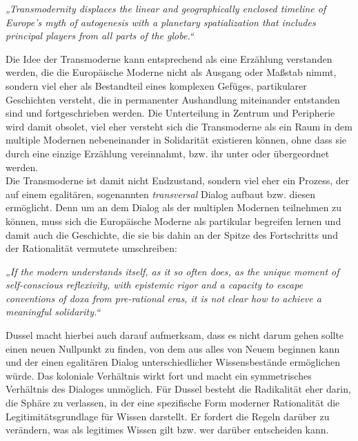 \begin{myenv}
    \textit{„Transmodernity displaces the linear and geographically enclosed timeline of
    Europe’s myth of autogenesis with a planetary spatialization that includes
    principal players from all parts of the globe.“\footnotemark}
\end{myenv}

Die Idee der Transmoderne kann entsprechend als eine Erzählung verstanden
werden, die die Europäische Moderne nicht als Ausgang oder Maßstab nimmt,
sondern viel eher als Bestandteil eines komplexen Gefüges, partikularer
Geschichten versteht, die in permanenter Aushandlung miteinander entstanden sind
und fortgeschrieben werden. Die Unterteilung in Zentrum und Peripherie wird
damit obsolet, viel eher versteht sich die Transmoderne als ein Raum in dem
multiple Modernen nebeneinander in Solidarität existieren können, ohne dass sie
durch eine einzige Erzählung vereinnahmt, bzw. ihr unter oder übergeordnet
werden.\footnotemark {}
\\

Die Transmoderne ist damit nicht Endzustand, sondern viel eher ein Prozess, der
auf einem egalitären, sogenannten \textit{transversal} Dialog aufbaut bzw. diesen
ermöglicht. Denn um an dem Dialog als der multiplen Modernen teilnehmen zu
können, muss sich die Europäische Moderne als partikular begreifen lernen und
damit auch die Geschichte, die sie bis dahin an der Spitze des Fortschritts und
der Rationalität vermutete umschreiben:

\begin{myenv} 
    \textit{„If the modern understands itself, as it so often does, as the
    unique moment of self-conscious reflexivity, with epistemic rigor and a
    capacity to escape conventions of doxa from pre-rational eras, it is not
clear how to achieve a meaningful solidarity.“\footnotemark {}}
\end{myenv}

Dussel macht hierbei auch darauf aufmerksam, dass es nicht darum gehen sollte
einen neuen Nullpunkt zu finden, von dem aus alles von Neuem beginnen kann und
der einen egalitären Dialog unterschiedlicher Wissensbestände ermöglichen würde.
Das koloniale Verhältnis wirkt fort und macht ein symmetrisches Verhältnis des
Dialoges unmöglich. Für Dussel besteht die Radikalität eher darin, die Sphäre zu
verlassen, in der eine spezifische Form moderner Rationalität die
Legitimitätsgrundlage für Wissen darstellt. Er fordert die Regeln darüber zu
verändern, was als legitimes Wissen gilt bzw. wer darüber entscheiden kann.

